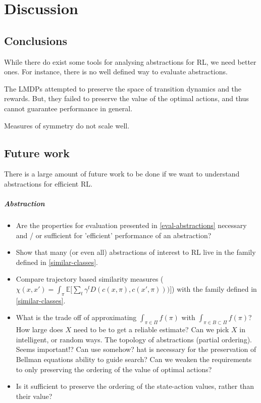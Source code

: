 \chapter{Discussion}\label{C:con}

\section{Conclusions}

While there do exist some tools for analysing abstractions for RL, we need better ones.
For instance, there is no well defined way to evaluate abstractions.

The LMDPs attempted to preserve the space of transition dynamics and the rewards. But, they failed to preserve the value of the optimal actions, and thus cannot guarantee performance in general.

Measures of symmetry do not scale well.

\section{Future work}

There is a large amount of future work to be done if we want to understand abstractions for efficient RL.

\paragraph{Abstraction}

\begin{itemize}
	\item Are the properties for evaluation presented in \ref{eval-abstractions} necessary and / or sufficient for 'efficient' performance of an abstraction?
	\item Show that many (or even all) abstractions of interest to RL live in the family defined in \ref{similar-classes}.
	\item Compare trajectory based similarity measures ($\chi(x, x') = \int_\pi \mathbb E \Big[\sum_t \gamma^t D(c(x, \pi), c(x', \pi)))\Big]$) with the family defined in \ref{similar-classes}.
	\item What is the trade off of approximating $\int_{\pi \in \Pi}f(\pi)$ with $\int_{\pi \in B \subset \Pi}f(\pi)$?
	How large does $X$ need to be to get a reliable estimate? Can we pick $X$ in intelligent, or random ways.
	The topology of abstractions (partial ordering). Seems important!? Can use somehow?
	hat is necessary for the preservation of Bellman equations ability to guide search? Can we weaken the requirements to only preserving the ordering of the value of optimal actions?
	\item Is it sufficient to preserve the ordering of the state-action values, rather than their value?
\end{itemize}

